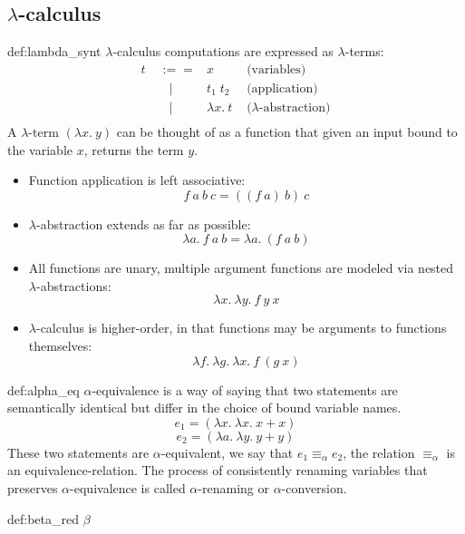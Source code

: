 \documentclass[landscape, 8pt]{extarticle}
\begin{document}
\begin{multicols}{3}
\subsection*{$\lambda$-calculus}
\begin{dfn}[Syntax]{def:lambda_synt}{}
$\lambda$-calculus computations are expressed as $\lambda$-terms:
\begin{equation}
\begin{aligned}
    t \; & :== & x & \text{    (variables)} \nonumber \\
       &\;\;\:|& t_1 \; t_2 & \text{    (application)} \nonumber \\
       &\;\;\:|& \lambda x.\:t & \text{    ($\lambda$-abstraction)} \nonumber \\
\end{aligned}
\end{equation}
A $\lambda$-term $(\lambda x.\:y)$ can be thought of as a function that given an input bound to the variable $x$, returns the term $y$.
\begin{itemize}
    \item Function application is left associative:
\[f\:a\:b\:c = ((f\:a)\:b)\:c\]
    \item $\lambda$-abstraction extends as far as possible:
\[\lambda a.\:f\:a\:b = \lambda a.\:(f\:a\:b)\]
\item All functions are unary, multiple argument functions are modeled via nested $\lambda$-abstractions:
\[\lambda x.\:\lambda y.\:f\:y\:x\]
\item $\lambda$-calculus is higher-order, in that functions may be arguments to functions themselves:
\[\lambda f.\:\lambda g.\:\lambda x.\:f\:(g\:x)\]
\end{itemize}
\end{dfn}

\begin{dfn}{def:alpha_eq}{}
$\alpha$-equivalence is a way of saying that two statements are semantically identical but differ in the choice of bound variable names.
\[e_1 = (\lambda x.\:\lambda x.\:x + x)\]
\[e_2 = (\lambda a.\:\lambda y.\:y + y)\]
These two statements are $\alpha$-equivalent, we say that $e_1 \equiv_\alpha e_2$, the relation $\equiv_\alpha$ is an equivalence-relation. The process of consistently renaming variables that preserves $\alpha$-equivalence is called $\alpha$-renaming or $\alpha$-conversion.    
\end{dfn}

\begin{dfn}{def:beta_red}{}
$\beta$    
\end{dfn}


\end{multicols}
\end{document}
